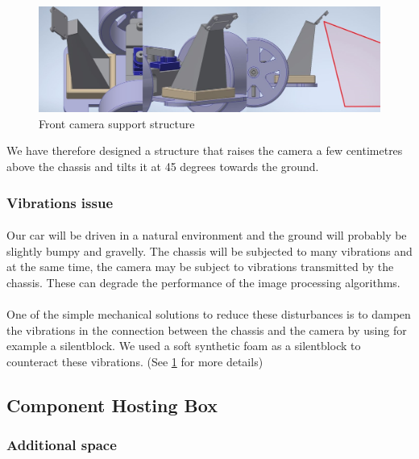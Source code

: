 \begin{figure}[!ht]
    \begin{center}
        \includegraphics[scale=0.58]{Images/camera_support.jpg}
    \end{center}
    \caption{Front camera support structure}
    \label{fig:camera_support}
\end{figure}

We have therefore designed a structure that raises the camera a few centimetres
above the chassis and tilts it at 45 degrees towards the ground. 

\subsubsection{Vibrations issue}
\paragraph{}
Our car will be driven in a natural environment and the ground will probably
be slightly bumpy and gravelly. The chassis will be
subjected to many vibrations and at the same time, the camera may be subject to
vibrations transmitted by the chassis. These can degrade the performance of the
image processing algorithms.

\paragraph{}
One of the simple mechanical solutions to reduce these disturbances is to dampen
the vibrations in the connection between the chassis and the camera by using for
example a silentblock.
We used a soft synthetic foam as a silentblock to counteract these vibrations.
(See \ref{fig:camera_support} for more details)

\subsection{Component Hosting Box}

\subsubsection{Additional space}
